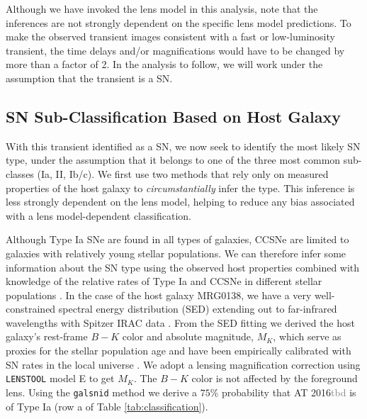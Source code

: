 \documentclass[12pt,dvipsnames]{article}
\def\SNABC{AT 2016{\textcolor{Gray}{tbd}}\xspace}
\def\lenstool{{\tt LENSTOOL}\xspace}
\begin{document}
Although we have invoked the lens model in this analysis, note that the inferences are not strongly dependent on the specific lens model predictions.  To make the observed transient images consistent with a fast or low-luminosity transient, the time delays and/or magnifications would have to be changed by more than a factor of 2.  In the analysis to follow, we will work under the assumption that the transient is a SN. 


\subsection*{SN Sub-Classification Based on Host Galaxy}
With this transient identified as a SN, we now seek to identify the most likely SN type, under the assumption that it belongs to one of the three most common sub-classes (Ia, II, Ib/c).   We first use two methods that rely only on measured properties of the host galaxy to {\it circumstantially} infer the type. This inference is less strongly dependent on the lens model, helping to reduce any bias associated with a lens model-dependent classification. 

Although Type Ia SNe are found in all types of galaxies, CCSNe are limited to galaxies with relatively young stellar populations.  We can therefore infer some information about the SN type using the observed host properties combined with knowledge of the relative rates of Type Ia and CCSNe in different stellar populations \cite{mannucci_rates_2005}.  In the case of the host galaxy MRG0138, we have a very well-constrained spectral energy distribution (SED) extending out to far-infrared wavelengths with Spitzer IRAC data \cite{newman_resolving_2018,newman_resolving_2018-1}.  
From the SED fitting we derived the host galaxy's 
rest-frame $B-K$ color and absolute magnitude, $M_K$, which serve as proxies for the stellar population age and have been empirically calibrated with SN rates in the local universe \cite{foley_classifying_2013}.  We adopt a lensing magnification correction using \lenstool model E to get $M_K$.  
The $B-K$ color is not affected by the foreground lens.
Using the {\tt galsnid} method \cite{foley_classifying_2013} we 
derive a $75\%$ probability that \SNABC is of Type Ia (row a of Table \ref{tab:classification}).
\end{document}
